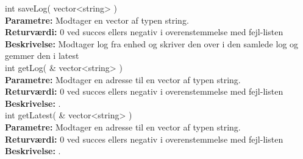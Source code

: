 int saveLog( vector<string> ) \\
\textbf{Parametre:} Modtager en vector af typen string. \\
\textbf{Returværdi:} 0 ved succes ellers negativ i overenstemmelse med fejl-listen \\
\textbf{Beskrivelse:} Modtager log fra enhed og skriver den over i den samlede log og gemmer den i latest \\

int getLog( \& vector<string> )  \\
\textbf{Parametre:} Modtager en adresse til en vector af typen string. \\
\textbf{Returværdi:} 0 ved succes ellers negativ i overenstemmelse med fejl-listen \\
\textbf{Beskrivelse:} .\\

int getLatest( \& vector<string> ) \\
\textbf{Parametre:} Modtager en adresse til en vector af typen string.  \\
\textbf{Returværdi:} 0 ved succes ellers negativ i overenstemmelse med fejl-listen \\
\textbf{Beskrivelse:} .\\


